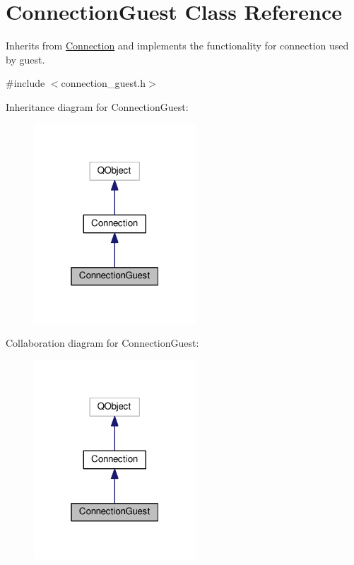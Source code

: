 \hypertarget{classMODEL_1_1ConnectionGuest}{}\section{Connection\+Guest Class Reference}
\label{classMODEL_1_1ConnectionGuest}


Inherits from \hyperlink{classMODEL_1_1Connection}{Connection} and implements the functionality for connection used by guest.  




{\ttfamily \#include $<$connection\+\_\+guest.\+h$>$}



Inheritance diagram for Connection\+Guest\+:\nopagebreak
\begin{figure}[H]
\begin{center}
\leavevmode
\includegraphics[width=172pt]{classMODEL_1_1ConnectionGuest__inherit__graph}
\end{center}
\end{figure}


Collaboration diagram for Connection\+Guest\+:\nopagebreak
\begin{figure}[H]
\begin{center}
\leavevmode
\includegraphics[width=172pt]{classMODEL_1_1ConnectionGuest__coll__graph}
\end{center}
\end{figure}
